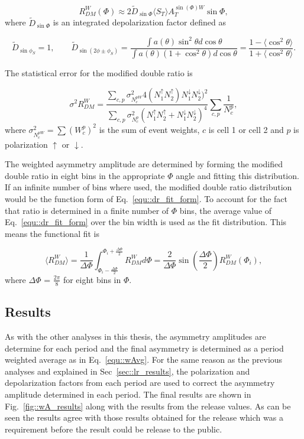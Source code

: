 \begin{equation}
  \label{equ::dr_fit_form}
  R^W_{DM}(\Phi) \approx 2 \tilde{D}_{\sin\Phi}\langle S_T \rangle
  A_T^{\sin(\Phi)W} \sin\Phi,
\end{equation}
\noindent
where $\tilde{D}_{\sin\Phi}$ is an integrated depolarization factor defined as

\begin{equation}
  \tilde{D}_{\sin\phi_S} = 1, \quad\quad \tilde{D}_{\sin(2\phi\pm\phi_S)} =
  \frac{\int a(\theta)\sin^2\theta d\cos\theta} {\int a(\theta)(1+\cos^2\theta)
    d\cos\theta} = \frac{1-\langle \cos^2\theta\rangle} {1+\langle
    \cos^2\theta\rangle}.
\end{equation}

The statistical error for the modified double ratio is

\begin{equation}
  \sigma^2{R^W_{DM}} = \frac{\sum_{c,p} \sigma^2_{N_c^{pW}}
    4(N^{\uparrow}_1N^{\uparrow}_2)N^{\downarrow}_1N^{\downarrow}_2)^2}
        {\sum_{c,p} \sigma^2_{N_c^{p}}
          (N^{\uparrow}_1N^{\uparrow}_2 + N^{\downarrow}_1N^{\downarrow}_2)^4}
        \sum_{c,p}\frac{1}{N_c^p},
\end{equation}
\noindent
where $\sigma^2_{N_c^{pW}} = \sum (W^p_c)^2$ is the sum of event weights, $c$ is
cell 1 or cell 2 and $p$ is polarization $\uparrow$ or $\downarrow$.

The weighted asymmetry amplitude are determined by forming the modified double
ratio in eight bins in the appropriate $\Phi$ angle and fitting this
distribution.  If an infinite number of bins where used, the modified double
ratio distribution would be the function form of Eq.~\ref{equ::dr_fit_form}.  To
account for the fact that ratio is determined in a finite number of $\Phi$ bins,
the average value of Eq.~\ref{equ::dr_fit_form} over the bin width is used as
the fit distribution.  This means the functional fit is

\begin{equation}
  \langle R^W_{DM} \rangle = \frac{1}{\Delta\Phi}
  \int_{\Phi_i-\frac{\Delta\Phi}{2}}^{\Phi_i+\frac{\Delta\Phi}{2}} R^W_{DM}
  d\Phi = \frac{2}{\Delta\Phi}\sin(\frac{\Delta\Phi}{2})R^W_{DM}(\Phi_i),
\end{equation}
\noindent
where $\Delta\Phi$ = $\frac{2\pi}{8}$ for eight bins in $\Phi$.

\subsection{Results}
As with the other analyses in this thesis, the asymmetry amplitudes are
determine for each period and the final asymmetry is determined as a period
weighted average as in Eq.~\ref{equ::wAvg}.  For the same reason as the previous
analyses and explained in Sec~\ref{sec::lr_results}, the polarization and
depolarization factors from each period are used to correct the asymmetry
amplitude determined in each period.  The final results are shown in
Fig.~\ref{fig::wA_results} along with the results from the release values.  As
can be seen the results agree with those results obtained for the release which
was a requirement before the result could be release to the public.


